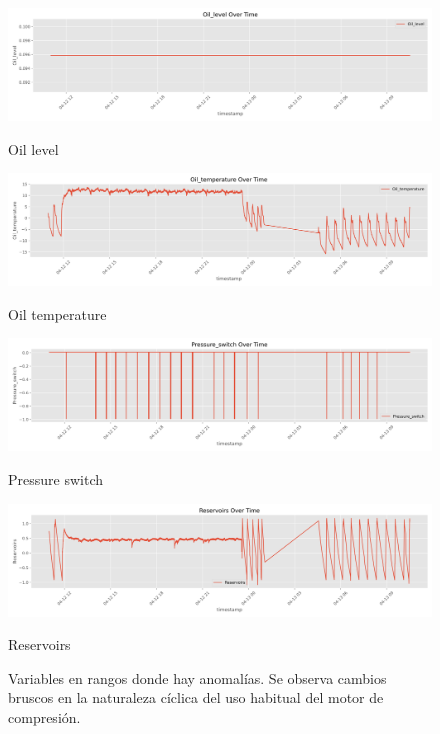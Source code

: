 \documentclass[12pt,letterpaper]{article}
\begin{document}
\begin{figure}[htp]
    \begin{minipage}[b]{0.45\textwidth}
        \centering
        \includegraphics[width=\textwidth]{Oil_level.png}
        \caption*{Oil level}
    \end{minipage}
    \hfill
    \begin{minipage}[b]{0.45\textwidth}
        \centering
        \includegraphics[width=\textwidth]{Oil_temperature.png}
        \caption*{Oil temperature}
    \end{minipage}
    \vspace{0.5em}

    \begin{minipage}[b]{0.45\textwidth}
        \centering
        \includegraphics[width=\textwidth]{Pressure_switch.png}
        \caption*{Pressure switch}
    \end{minipage}
    \hfill
    \begin{minipage}[b]{0.45\textwidth}
        \centering
        \includegraphics[width=\textwidth]{Reservoirs.png}
        \caption*{Reservoirs}
    \end{minipage}
\caption{Variables en rangos donde hay anomalías. Se observa cambios bruscos en la naturaleza cíclica del uso habitual del motor de compresión.}
\label{fig:anomaly_in_variables}
\end{figure}
\end{document}
